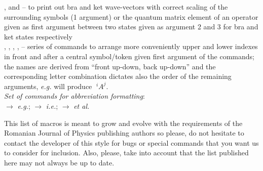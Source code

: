\documentclass[myclassdoc,debug]{rjparticle}
\begin{document}
\noindent{},  and  -- to print out bra and ket wave-vectors with correct scaling of the surrounding symbols (1 argument) or the quantum matrix element of an operator given as first argument between two states given as argument 2 and 3 for bra and ket states respectively \\
\noindent{}, , ,
,  -- series of commands to arrange more conveniently upper and lower indexes in front and after a central symbol/token given first argument of the commands; the names are derived from ``front up-down, back up-down'' and the corresponding letter combination dictates also the order of the remaining arguments, \textit{e.g.}  will produce ${\!\;}^{i}\!\!A^{j}$.\\
\textit{Set of commands for abbreviation formatting}:\\
 $\to$ \textit{e.g.};  $\to$ \textit{i.e.};  $\to$ \textit{et al.}

This list of macros is meant to grow and evolve with the requirements of the Romanian Journal of Physics publishing authors so please, do not hesitate to contact the developer of this style for bugs or special commands that you want us to consider for inclusion. Also, please, take into account that the list published here may not always be up to date.


\end{document}
